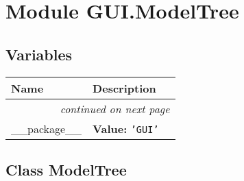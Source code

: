 %
%
%


\section{Module GUI.ModelTree}

    \label{GUI:ModelTree}


  \subsection{Variables}

    \vspace{-1cm}
\hspace{\varindent}\begin{longtable}{|p{\varnamewidth}|p{\vardescrwidth}|l}
\cline{1-2}
\cline{1-2} \centering \textbf{Name} & \centering \textbf{Description}& \\
\cline{1-2}
\endhead\cline{1-2}\multicolumn{3}{r}{\small\textit{continued on next page}}\\\endfoot\cline{1-2}
\endlastfoot\raggedright \_\-\_\-p\-a\-c\-k\-a\-g\-e\-\_\-\_\- & \raggedright \textbf{Value:} 
{\tt \texttt{'}\texttt{GUI}\texttt{'}}&\\
\cline{1-2}
\end{longtable}



\subsection{Class ModelTree}

